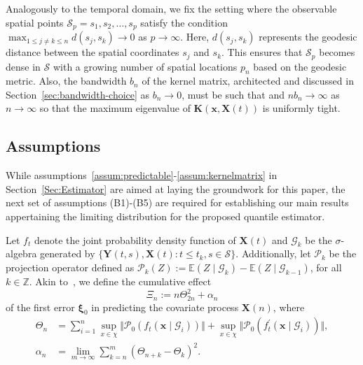 \documentclass[aos]{imsart}
\theoremstyle{plain}
\theoremstyle{remark}
\def\E{\mathbb{E}}
\def\Z{\mathbb{Z}}
\newcommand{\Gcal}{\mathcal{G}}
\newcommand{\Scal}{\mathcal{S}}
\newcommand{\dash}{^{\prime}}
\newcommand{\bb}[1]{\boldsymbol{#1}}
\newcommand{\kernel}[1]{\bb{K}(\bb{x}, \bb{X}(#1))}
\begin{document}
 Analogously to the temporal domain, we fix the setting where the observable spatial points $\Scal_p = { s_1, s_2, \dots, s_p }$ satisfy the condition $\max_{1 \leqslant j \neq k \leqslant n} d(s_j, s_k) \rightarrow 0$ as $p \rightarrow \infty$. Here, $d(s_j, s_k)$ represents the geodesic distance between the spatial coordinates $s_j$ and $s_k$. This ensures that $\Scal_p$ becomes dense in $\Scal$ with a growing number of spatial locations $p_n$ based on the geodesic metric. Also, the bandwidth $b_n$ of the kernel matrix, architected and discussed in Section~\ref{sec:bandwidth-choice} as $b_n \rightarrow 0$, must be such that and $nb_n \rightarrow \infty$ as $n \rightarrow \infty$ so that the maximum eigenvalue of $\kernel{t}$ is uniformly tight.


\subsection{Assumptions}


While assumptions~\ref{assum:predictable}-\ref{assum:kernelmatrix} in Section~\ref{Sec:Estimator} are aimed at laying the groundwork for this paper, the next set of assumptions (B1)-(B5) are required for establishing our main results appertaining  the limiting distribution for the proposed quantile estimator.

Let $f_{t}$ denote the joint probability density function of $\bb{X}(t)$ and $\Gcal_{k}$ be the $\sigma$-algebra generated by $\{ \bb{Y}(t, s), \bb{X}(t): t \leqslant t_k, s \in \Scal \}$. Additionally, let $\mathcal{P}_k$ be the projection operator defined as $\mathcal{P}_k(Z) := \E(Z\mid \Gcal_{k}) - \E(Z\mid \Gcal_{k-1})$, for all $k \in \Z$. Akin to~\cite{zhao2008confidence}, we define the cumulative effect 
\begin{equation*}
    \Xi_n  := n\Theta_{2n}^2 + \alpha_n
\end{equation*}
of the first error $\bb{\xi}_0$ in predicting the covariate process $\bb{X}(n)$, where
\begin{align*}
        \Theta_n & = \sum_{i=1}^n \sup_{x\in \chi} \Vert \mathcal{P}_0(f_t(\bb{x} \mid \Gcal_i)) \Vert + \sup_{x\in \chi} \Vert \mathcal{P}_0(f_t\dash(\bb{x} \mid \Gcal_i)) \Vert,\\
        \alpha_n & = \lim_{m \rightarrow \infty} \sum_{k = n}^{m} \left( \Theta_{n+k} - \Theta_k \right)^2.
\end{align*}
\end{document}
